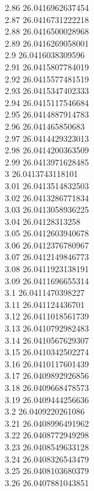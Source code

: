 {2.86	26.0416962637454\\
2.87	26.0416731222218\\
2.88	26.0416500028968\\
2.89	26.0416269058001\\
2.9	26.0416038309596\\
2.91	26.0415807784019\\
2.92	26.0415577481519\\
2.93	26.0415347402333\\
2.94	26.0415117546684\\
2.95	26.0414887914783\\
2.96	26.041465850683\\
2.97	26.0414429323013\\
2.98	26.0414200363509\\
2.99	26.0413971628485\\
3	26.0413743118101\\
3.01	26.0413514832503\\
3.02	26.0413286771834\\
3.03	26.0413058936225\\
3.04	26.04128313258\\
3.05	26.0412603940678\\
3.06	26.0412376780967\\
3.07	26.0412149846773\\
3.08	26.0411923138191\\
3.09	26.0411696655314\\
3.1	26.0411470398227\\
3.11	26.041124436701\\
3.12	26.0411018561739\\
3.13	26.0410792982483\\
3.14	26.0410567629307\\
3.15	26.0410342502274\\
3.16	26.0410117601439\\
3.17	26.0409892926856\\
3.18	26.0409668478573\\
3.19	26.0409444256636\\
3.2	26.0409220261086\\
3.21	26.0408996491962\\
3.22	26.0408772949298\\
3.23	26.0408549633128\\
3.24	26.0408326543479\\
3.25	26.0408103680379\\
3.26	26.0407881043851\\
}
